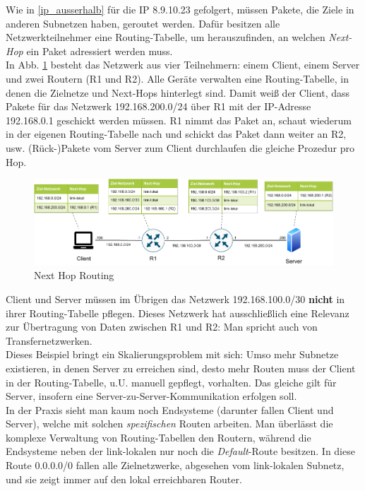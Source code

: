 Wie in \ref{ip_ausserhalb} für die IP 8.9.10.23 gefolgert, müssen Pakete, die Ziele in anderen Subnetzen haben, geroutet werden. Dafür besitzen alle Netzwerkteilnehmer eine Routing-Tabelle, um herauszufinden, an welchen \textit{Next-Hop} ein Paket adressiert werden muss.\\
In Abb. \ref{grafik: next_hop_routing} besteht das Netzwerk aus vier Teilnehmern: einem \gls{Client}, einem Server und zwei Routern (R1 und R2). Alle Geräte verwalten eine Routing-Tabelle, in denen die Zielnetze und Next-Hops hinterlegt sind.
Damit weiß der \gls{Client}, dass Pakete für das Netzwerk 192.168.200.0/24 über R1 mit der IP-Adresse 192.168.0.1 geschickt werden müssen. R1 nimmt das Paket an, schaut wiederum in der eigenen Routing-Tabelle nach und schickt das Paket dann weiter an R2, usw. (Rück-)Pakete vom Server zum \gls{Client} durchlaufen die gleiche Prozedur pro Hop.\\
\begin{figure}[h]
  \centering
  \includegraphics[scale=0.9]{Figures/next_hop_routing_specific_table.pdf}
  \caption{Next Hop Routing}
  \label{grafik: next_hop_routing}
\end{figure}\FloatBarrier
\gls{Client} und Server müssen im Übrigen das Netzwerk 192.168.100.0/30 \textbf{nicht} in ihrer Routing-Tabelle pflegen. Dieses Netzwerk hat ausschließlich eine Relevanz zur Übertragung von Daten zwischen R1 und R2: Man spricht auch von Transfernetzwerken.\\
Dieses Beispiel bringt ein Skalierungsproblem mit sich: Umso mehr Subnetze existieren, in denen Server zu erreichen sind, desto mehr Routen muss der \gls{Client} in der Routing-Tabelle, u.U. manuell gepflegt, vorhalten. Das gleiche gilt für Server, insofern eine Server-zu-Server-Kommunikation erfolgen soll.\\
In der Praxis sieht man kaum noch Endsysteme (darunter fallen \gls{Client} und Server), welche mit solchen \textit{spezifischen} Routen arbeiten. Man überlässt die komplexe Verwaltung von Routing-Tabellen den Routern, während die Endsysteme neben der link-lokalen nur noch die \textit{Default}-Route besitzen. In diese Route 0.0.0.0/0 fallen alle Zielnetzwerke, abgesehen vom link-lokalen Subnetz, und sie zeigt immer auf den lokal erreichbaren Router.\\
